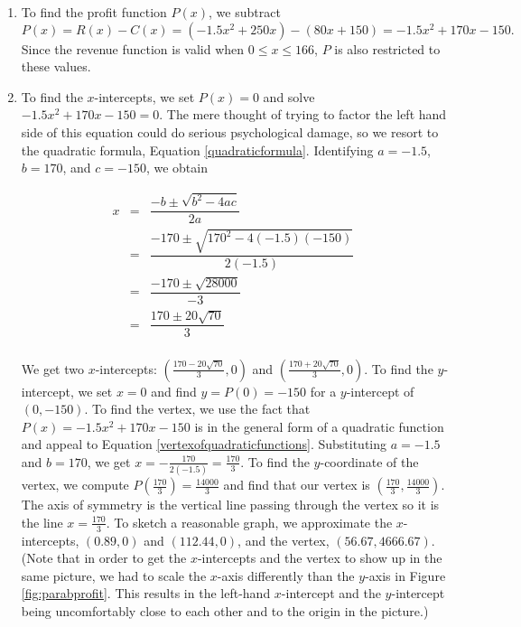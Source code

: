 {
\begin{enumerate}

\item  To find the profit function $P(x)$, we subtract \[P(x) = R(x) - C(x) = \left(-1.5x^2+250x\right) - \left(80x + 150\right) = -1.5x^2+170x-150.\]  Since the revenue function is valid when $0 \leq x \leq 166$, $P$ is also restricted to these values. 

\item  To find the $x$-intercepts, we set $P(x) = 0$ and solve  $-1.5x^2+170x-150=0$. The mere thought of trying to factor the left hand side of this equation could do serious psychological damage, so we resort to the quadratic formula, Equation \ref{quadraticformula}.  Identifying $a = -1.5$, $b=170$, and $c=-150$, we obtain

\setlength{\extrarowheight}{10pt}
\[ \begin{array}{rclr} x & = & \dfrac{-b \pm \sqrt{b^2-4ac}}{2a} & \\ & = & \dfrac{-170 \pm \sqrt{170^2 - 4(-1.5)(-150)}}{2(-1.5)} & \\ & = & \dfrac{-170 \pm \sqrt{28000}}{-3} & \\ & = & \dfrac{170 \pm 20 \sqrt{70}}{3} & \\ \end{array}\]

We get two $x$-intercepts: $\left( \frac{170 - 20 \sqrt{70}}{3},0\right)$ and $\left( \frac{170 + 20 \sqrt{70}}{3},0\right)$.  To find the $y$-intercept, we set $x=0$ and find $y=P(0)=-150$ for a $y$-intercept of $(0,-150)$.  To find the vertex, we use the fact that $P(x)=-1.5x^2+170x-150$ is in the general form of a quadratic function and appeal to Equation \ref{vertexofquadraticfunctions}.  Substituting $a = -1.5$ and $b=170$, we get $x = -\frac{170}{2(-1.5)} = \frac{170}{3}$.  To find the $y$-coordinate of the vertex, we compute $P\left( \frac{170}{3} \right) = \frac{14000}{3}$ and find that our vertex is $\left(\frac{170}{3}, \frac{14000}{3}\right)$.  The axis of symmetry is the vertical line passing through the vertex so it is the line $x=\frac{170}{3}$.  To sketch a reasonable graph, we approximate the $x$-intercepts,  $(0.89,0)$ and $(112.44,0)$, and the vertex, $(56.67,4666.67)$.  (Note that in order to get the $x$-intercepts and the vertex to show up in the same picture, we had to scale the $x$-axis differently than the $y$-axis in Figure \ref{fig:parabprofit}.  This results in the left-hand $x$-intercept and the $y$-intercept being uncomfortably close to each other and to the origin in the picture.)


\end{enumerate}}
